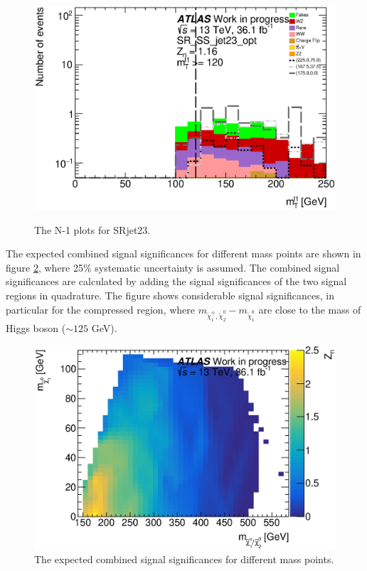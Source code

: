 \begin{figure}[htpb]
\includegraphics[width=0.45\linewidth]{data/plot/plot_SR/mt1_SR_SS_jet23_opt_0}\\
\caption{The N-1 plots for SRjet23.}
\label{fig:SRjet23_N1}
\end{figure}

The expected combined signal significances for different mass points are shown in figure \ref{fig:SR_expected_limit}, where 25\% systematic uncertainty is assumed.
The combined signal significances are calculated by adding the signal significances of the two signal regions in quadrature.
The figure shows considerable signal significances, in particular for the compressed region, where $m_{\tilde{\chi}_1^\pm , \tilde{\chi}_2^0} - m_{\tilde{\chi}_1^0}$ are close to the mass of Higgs boson ($\sim 125$ GeV).

\begin{figure}[htpb]
\centering
\includegraphics[width=0.5\linewidth]{data/plot/plot_SR/combine_significance_0}
\caption{The expected combined signal significances for different mass points.}
\label{fig:SR_expected_limit}
\end{figure}
